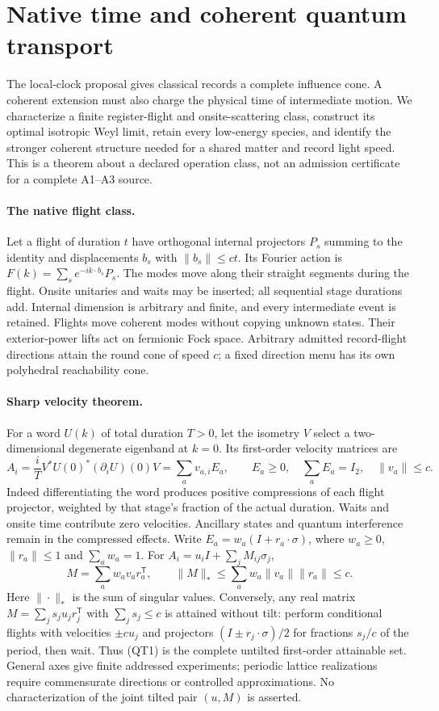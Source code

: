 \section{Native time and coherent quantum transport}
\label{app:m1-quantum-transport}

The local-clock proposal gives classical records a complete influence cone.
A coherent extension must also charge the physical time of intermediate
motion. We characterize a finite register-flight and onsite-scattering
class, construct its optimal isotropic Weyl limit, retain every low-energy
species, and identify the stronger coherent structure needed for a shared
matter and record light speed. This is a theorem about a declared operation
class, not an admission certificate for a complete A1--A3 source.

\paragraph{The native flight class.}
Let a flight of duration $t$ have orthogonal internal projectors $P_s$
summing to the identity and displacements $b_s$ with $\|b_s\|\leq ct$.
Its Fourier action is $F(k)=\sum_s e^{-ik\cdot b_s}P_s$.
The modes move along their straight segments during the flight. Onsite
unitaries and waits may be inserted; all sequential stage durations add.
Internal dimension is arbitrary and finite, and every intermediate event
is retained. Flights move coherent modes without copying unknown states.
Their exterior-power lifts act on fermionic Fock space. Arbitrary admitted
record-flight directions attain the round cone of speed $c$; a fixed
direction menu has its own polyhedral reachability cone.

\paragraph{Sharp velocity theorem.}
For a word $U(k)$ of total duration $T>0$, let the isometry $V$ select a
two-dimensional degenerate eigenband at $k=0$. Its first-order velocity
matrices are
\[
 A_i=\frac{i}{T}V^*U(0)^*(\partial_iU)(0)V
     =\sum_a v_{a,i}E_a,\qquad
 E_a\geq0,\quad \sum_aE_a=I_2,\quad \|v_a\|\leq c.
\]
Indeed differentiating the word produces positive compressions of each
flight projector, weighted by that stage's fraction of the actual duration.
Waits and onsite time contribute zero velocities. Ancillary states and
quantum interference remain in the compressed effects.
Write $E_a=w_a(I+r_a\cdot\sigma)$, where $w_a\geq0$,
$\|r_a\|\leq1$ and $\sum_a w_a=1$. For
$A_i=u_iI+\sum_jM_{ij}\sigma_j$,
\[
 M=\sum_a w_av_ar_a^{\mathsf T},\qquad
 \|M\|_*\leq\sum_a w_a\|v_a\|\|r_a\|\leq c.
 \tag{QT1}
\]
Here $\|\cdot\|_*$ is the sum of singular values. Conversely, any real
matrix $M=\sum_j s_j u_jr_j^{\mathsf T}$ with $\sum_j s_j\leq c$
is attained without tilt: perform conditional flights with velocities
$\pm cu_j$ and projectors $(I\pm r_j\cdot\sigma)/2$ for fractions
$s_j/c$ of the period, then wait. Thus (QT1) is the complete untilted
first-order attainable set. General axes give finite addressed experiments;
periodic lattice realizations require commensurate directions or controlled
approximations. No characterization of the joint tilted pair $(u,M)$ is
asserted.

